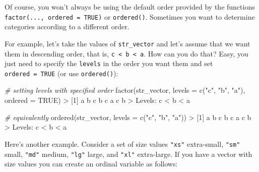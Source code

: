 \documentclass[
]{book}
\newenvironment{Shaded}{\begin{snugshade}}{\end{snugshade}}
\newcommand{\AttributeTok}[1]{\textcolor[rgb]{0.77,0.63,0.00}{#1}}
\newcommand{\CommentTok}[1]{\textcolor[rgb]{0.56,0.35,0.01}{\textit{#1}}}
\newcommand{\ConstantTok}[1]{\textcolor[rgb]{0.00,0.00,0.00}{#1}}
\newcommand{\DecValTok}[1]{\textcolor[rgb]{0.00,0.00,0.81}{#1}}
\newcommand{\FunctionTok}[1]{\textcolor[rgb]{0.00,0.00,0.00}{#1}}
\newcommand{\NormalTok}[1]{#1}
\newcommand{\SpecialCharTok}[1]{\textcolor[rgb]{0.00,0.00,0.00}{#1}}
\newcommand{\StringTok}[1]{\textcolor[rgb]{0.31,0.60,0.02}{#1}}
\begin{document}
Of course, you won't always be using the default order provided by the
functions \texttt{factor(...,\ ordered\ =\ TRUE)} or \texttt{ordered()}. Sometimes you want to
determine categories according to a different order.

For example, let's take the values of \texttt{str\_vector} and let's assume that we
want them in descending order, that is, \texttt{c\ \textless{}\ b\ \textless{}\ a}. How can you do that? Easy,
you just need to specify the \texttt{levels} in the order you want them and set
\texttt{ordered\ =\ TRUE} (or use \texttt{ordered()}):

\begin{Shaded}
\begin{Highlighting}[]
\CommentTok{\# setting levels with specified order}
\FunctionTok{factor}\NormalTok{(str\_vector, }\AttributeTok{levels =} \FunctionTok{c}\NormalTok{(}\StringTok{"c"}\NormalTok{, }\StringTok{"b"}\NormalTok{, }\StringTok{"a"}\NormalTok{), }\AttributeTok{ordered =} \ConstantTok{TRUE}\NormalTok{)}
\SpecialCharTok{\textgreater{}}\NormalTok{ [}\DecValTok{1}\NormalTok{] a b c b c a c b}
\SpecialCharTok{\textgreater{}}\NormalTok{ Levels}\SpecialCharTok{:}\NormalTok{ c }\SpecialCharTok{\textless{}}\NormalTok{ b }\SpecialCharTok{\textless{}}\NormalTok{ a}

\CommentTok{\# equivalently}
\FunctionTok{ordered}\NormalTok{(str\_vector, }\AttributeTok{levels =} \FunctionTok{c}\NormalTok{(}\StringTok{"c"}\NormalTok{, }\StringTok{"b"}\NormalTok{, }\StringTok{"a"}\NormalTok{))}
\SpecialCharTok{\textgreater{}}\NormalTok{ [}\DecValTok{1}\NormalTok{] a b c b c a c b}
\SpecialCharTok{\textgreater{}}\NormalTok{ Levels}\SpecialCharTok{:}\NormalTok{ c }\SpecialCharTok{\textless{}}\NormalTok{ b }\SpecialCharTok{\textless{}}\NormalTok{ a}
\end{Highlighting}
\end{Shaded}

Here's another example. Consider a set of size values \texttt{"xs"} extra-small, \texttt{"sm"}
small, \texttt{"md"} medium, \texttt{"lg"} large, and \texttt{"xl"} extra-large. If you have a
vector with size values you can create an ordinal variable as follows:
\end{document}
